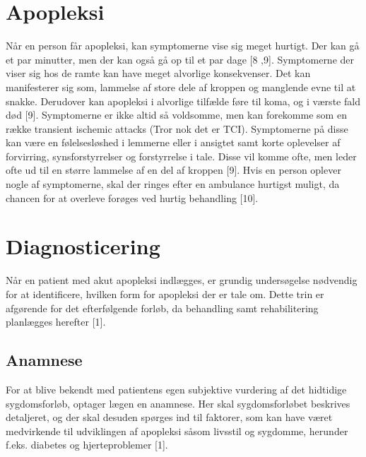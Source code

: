 \section{Apopleksi}

Når en person får apopleksi, kan symptomerne vise sig meget hurtigt. Der kan gå et par minutter, men der kan også gå op til et par dage [8 ,9]. Symptomerne der viser sig hos de ramte kan have meget alvorlige konsekvenser. Det kan manifesterer sig som, lammelse af store dele af kroppen og manglende evne til at snakke. Derudover kan apopleksi i alvorlige tilfælde føre til koma, og i værste fald død [9]. Symptomerne er ikke altid så voldsomme, men kan forekomme som en række transient ischemic attacks (Tror nok det er TCI). Symptomerne på disse kan være en følelsesløshed i lemmerne eller i ansigtet samt korte oplevelser af forvirring, synsforstyrrelser og forstyrrelse i tale. Disse vil komme ofte, men leder ofte ud til en større lammelse af en del af kroppen [9].
Hvis en person oplever nogle af symptomerne, skal der ringes efter en ambulance hurtigst muligt, da chancen for at overleve forøges ved hurtig behandling [10]. 

\section{Diagnosticering}

Når en patient med akut apopleksi indlægges, er grundig undersøgelse nødvendig for at identificere, hvilken form for apopleksi der er tale om. Dette trin er afgørende for det efterfølgende forløb, da behandling samt rehabilitering planlægges herefter [1].

\subsection{Anamnese}
For at blive bekendt med patientens egen subjektive vurdering af det hidtidige sygdomsforløb, optager lægen en anamnese. Her skal sygdomsforløbet  beskrives detaljeret, og der skal desuden spørges ind til faktorer, som kan have været medvirkende til udviklingen af apopleksi såsom livsstil og sygdomme, herunder f.eks. diabetes og hjerteproblemer [1].

